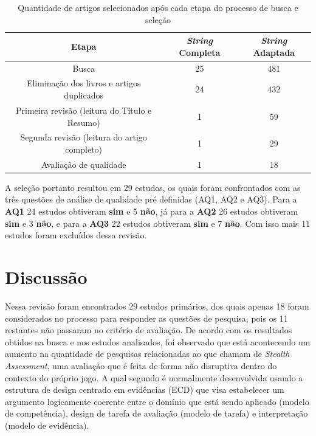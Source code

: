 \documentclass[12pt]{article}
\begin{document}
\begin{table}[ht]
    \centering
    \caption{Quantidade de artigos selecionados após cada etapa do processo de busca e seleção}
    \label{tab:resultado_busca}
    \begin{tabular}{|c|c|c|} 
      \hline
      Etapa & \textit{String} Completa & \textit{String} Adaptada \\
      \hline
      Busca & 25 & 481 \\
      \hline
      Eliminação dos livros e artigos duplicados & 24 & 432 \\
      \hline
      Primeira revisão (leitura do Título e Resumo) & 1 & 59 \\
      \hline
      Segunda revisão (leitura do artigo completo) & 1 & 29 \\
      \hline
      Avaliação de qualidade & 1 & 18 \\
      \hline
    \end{tabular}
\end{table}

A seleção portanto resultou em 29 estudos, os quais foram confrontados com as três questões de análise de qualidade pré definidas (AQ1, AQ2 e AQ3). Para a \textbf{AQ1} 24 estudos obtiveram \textbf{sim} e 5 \textbf{não}, já para a \textbf{AQ2} 26 estudos obtiveram \textbf{sim} e 3 \textbf{não}, e para a \textbf{AQ3} 22 estudos obtiveram \textbf{sim} e 7 \textbf{não}. Com isso mais 11 estudos foram excluídos dessa revisão.

\section{Discussão}\label{sec:discussao}

Nessa revisão foram encontrados 29 estudos primários, dos quais apenas 18 foram considerados no processo para responder as questões de pesquisa, pois os 11 restantes não passaram no critério de avaliação. De acordo com os resultados obtidos na busca e nos estudos analisados, foi observado que está acontecendo um aumento na quantidade de pesquisas relacionadas ao que chamam de \textit{Stealth Assessment}, uma avaliação que é feita de forma não disruptiva dentro do contexto do próprio jogo. A qual segundo \cite{mislevy2006implications} é normalmente desenvolvida usando a estrutura de design centrado em evidências (ECD) que visa estabelecer um argumento logicamente coerente entre o domínio que está sendo aplicado (modelo de competência), design de tarefa de avaliação (modelo de tarefa) e interpretação (modelo de evidência).
\end{document}
